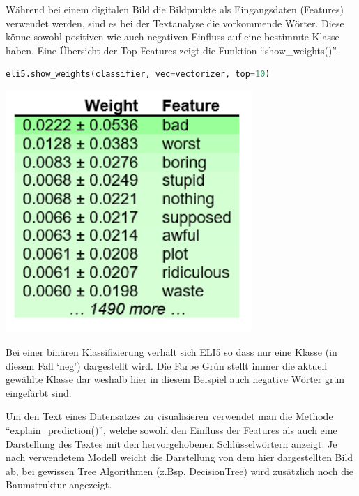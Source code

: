 \documentclass[
  12pt, %
  a4paper, %
  oneside, %
  openany, 
  numbers=noenddot, %
  BCOR=5mm, %
  parskip=half*, %
  thesis, %
]{bfhbook}
\begin{document}
Während bei einem digitalen Bild die Bildpunkte als Eingangsdaten (Features) verwendet werden, sind es bei der Textanalyse die vorkommende Wörter. Diese könne sowohl positiven wie auch negativen Einfluss auf eine bestimmte Klasse haben. Eine Übersicht der Top Features zeigt die Funktion ``show\_weights()''.
\begin{lstlisting}[language=Python]
eli5.show_weights(classifier, vec=vectorizer, top=10)
\end{lstlisting}
\begin{center}
\begin{minipage}[t]{0.45\linewidth}
\vspace{0pt}
\centering
	\includegraphics[width=0.7\textwidth]{Bilder/MovieReviews-SentimentClassification_Weights.PNG}
\end{minipage}\hfill
\begin{minipage}[t]{0.45\linewidth}
\vspace{20pt}
Bei einer binären Klassifizierung verhält sich ELI5  so dass nur eine Klasse (in diesem Fall `neg') dargestellt wird. Die Farbe Grün stellt immer die aktuell gewählte Klasse dar weshalb hier in diesem Beispiel auch negative Wörter grün eingefärbt sind.
\end{minipage}
\end{center}

Um den Text eines Datensatzes zu visualisieren verwendet man die Methode ``explain\_prediction()'', welche sowohl den Einfluss der Features als auch eine Darstellung des Textes mit den hervorgehobenen Schlüsselwörtern anzeigt. Je nach verwendetem Modell weicht die Darstellung von dem hier dargestellten Bild ab, bei gewissen Tree Algorithmen (z.Bsp. DecisionTree) wird zusätzlich noch die Baumstruktur angezeigt.
\end{document}
